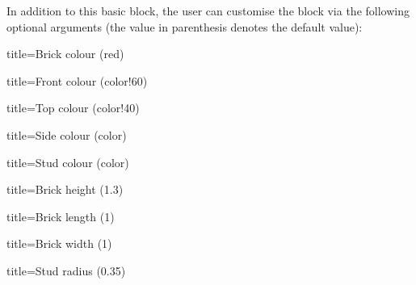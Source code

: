 \documentclass[parskip=half]{scrartcl}
\begin{document}
In addition to this basic block, the user can customise the block via the following optional arguments (the value in parenthesis denotes the default value):
\begin{tcblisting}{title={Brick colour (red)}}
\end{tcblisting}
\begin{tcblisting}{title={Front colour (color!60)}}
\end{tcblisting}
\begin{tcblisting}{title={Top colour (color!40)}}
\end{tcblisting}
\begin{tcblisting}{title={Side colour (color)}}
\end{tcblisting}
\begin{tcblisting}{title={Stud colour (color)}}
\end{tcblisting}
\begin{tcblisting}{title={Brick height (1.3)}}
\end{tcblisting}
\begin{tcblisting}{title={Brick length (1)}}
\end{tcblisting}
\begin{tcblisting}{title={Brick width (1)}}
\end{tcblisting}
\begin{tcblisting}{title={Stud radius (0.35)}}
\end{tcblisting}
\end{document}
